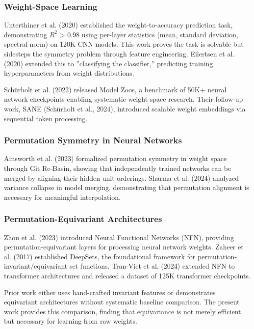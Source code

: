 
\subsubsection{Weight-Space Learning}

Unterthiner et al. (2020) established the weight-to-accuracy prediction task, demonstrating $R^2$ > 0.98 using per-layer statistics (mean, standard deviation, spectral norm) on 120K CNN models. This work proves the task is solvable but sidesteps the symmetry problem through feature engineering. Eilertsen et al. (2020) extended this to ''classifying the classifier,'' predicting training hyperparameters from weight distributions.

Schürholt et al. (2022) released Model Zoos, a benchmark of 50K+ neural network checkpoints enabling systematic weight-space research. Their follow-up work, SANE (Schürholt et al., 2024), introduced scalable weight embeddings via sequential token processing.

\subsubsection{Permutation Symmetry in Neural Networks}

Ainsworth et al. (2023) formalized permutation symmetry in weight space through Git Re-Basin, showing that independently trained networks can be merged by aligning their hidden unit orderings. Sharma et al. (2024) analyzed variance collapse in model merging, demonstrating that permutation alignment is necessary for meaningful interpolation.

\subsubsection{Permutation-Equivariant Architectures}

Zhou et al. (2023) introduced Neural Functional Networks (NFN), providing permutation-equivariant layers for processing neural network weights. Zaheer et al. (2017) established DeepSets, the foundational framework for permutation-invariant/equivariant set functions. Tran-Viet et al. (2024) extended NFN to transformer architectures and released a dataset of 125K transformer checkpoints.

Prior work either uses hand-crafted invariant features or demonstrates equivariant architectures without systematic baseline comparison. The present work provides this comparison, finding that equivariance is not merely efficient but necessary for learning from raw weights.
